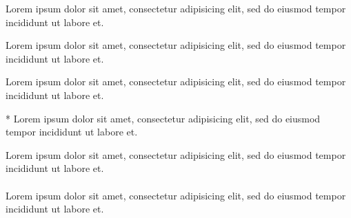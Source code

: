 \documentclass{article}
\begin{document}
\clozereset

\begin{clozebox}[boxwidth=5cm]
Lorem ipsum dolor sit amet, consectetur adipisicing elit, sed do eiusmod
tempor incididunt ut labore et.
\end{clozebox}


\clozereset

\begin{clozebox}[boxwidth=5cm,boxheight=5cm]
Lorem ipsum dolor sit amet, consectetur adipisicing elit, sed do eiusmod
tempor incididunt ut labore et.
\end{clozebox}


\clozereset

\begin{clozebox}[box_rule=0.2cm,hide]
Lorem ipsum dolor sit amet, consectetur adipisicing elit, sed do eiusmod
tempor incididunt ut labore et.
\end{clozebox}


\begin{clozebox}*
Lorem ipsum dolor sit amet, consectetur adipisicing elit, sed do eiusmod
tempor incididunt ut labore et.
\end{clozebox}


\begin{clozebox}
\noindent
Lorem ipsum dolor sit amet, consectetur adipisicing elit, sed do eiusmod
tempor incididunt ut labore et.\\\\
%
Lorem ipsum dolor sit amet, consectetur adipisicing elit, sed do eiusmod
tempor incididunt ut labore et.
\end{clozebox}
\end{document}
